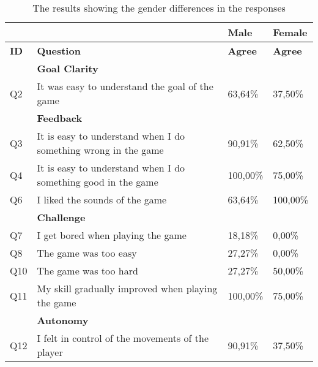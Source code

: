 \begin{table}[ht]
	\centering
	\caption{The results showing the gender differences in the responses}
	\label{tab:gender_diff}
	\begin{tabularx}{\textwidth}{|l|X|l|l|}
		\hline
		& \textbf{}                                                      & \textbf{Male}  & \textbf{Female} \\ \hline
		\textbf{ID} & \textbf{Question}                                              & \textbf{Agree} & \textbf{Agree}  \\ \hline
		& \textbf{Goal Clarity}                                          &                &                 \\ \hline
		Q2          & It was easy to understand the goal of the game                 & 63,64\%        & 37,50\%         \\ \hline
		& \textbf{Feedback}                                              &                &                 \\ \hline
		Q3          & It is easy to understand when I do something wrong in the game & 90,91\%        & 62,50\%         \\ \hline
		Q4          & It is easy to understand when I do something good in the game  & 100,00\%       & 75,00\%         \\ \hline
		Q6          & I liked the sounds of the game                                 & 63,64\%        & 100,00\%        \\ \hline
		& \textbf{Challenge}                                             &                &                 \\ \hline
		Q7          & I get bored when playing the game                              & 18,18\%        & 0,00\%          \\ \hline
		Q8          & The game was too easy                                          & 27,27\%        & 0,00\%          \\ \hline
		Q10         & The game was too hard                                          & 27,27\%        & 50,00\%         \\ \hline
		Q11         & My skill gradually improved when playing the game              & 100,00\%       & 75,00\%         \\ \hline
		& \textbf{Autonomy}                                              &                &                 \\ \hline
		Q12         & I felt in control of the movements of the player               & 90,91\%        & 37,50\%         \\ \hline

\end{tabularx}
\end{table}
